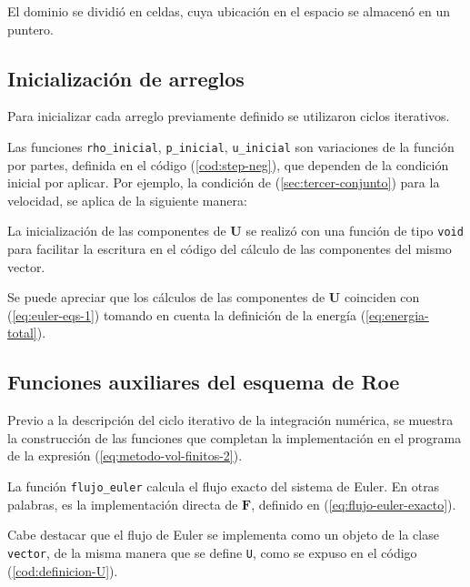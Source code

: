 El dominio se dividió en celdas, cuya ubicación en el espacio se almacenó en un puntero.

\subsection{Inicialización de arreglos}
Para inicializar cada arreglo previamente definido se utilizaron ciclos iterativos.


Las funciones \texttt{rho\_inicial}, \texttt{p\_inicial}, \texttt{u\_inicial} son variaciones de la función por partes, definida en el código (\ref{cod:step-neg}), que dependen de la condición inicial por aplicar. Por ejemplo, la condición de (\ref{sec:tercer-conjunto}) para la velocidad, se aplica de la siguiente manera:


La inicialización de las componentes de $\mathbf{{U}}$ se realizó con una función de tipo \texttt{void} para facilitar la escritura en el código del cálculo de las componentes del mismo vector.

Se puede apreciar que los cálculos de las componentes de $\mathbf{{U}}$ coinciden con (\ref{eq:euler-eqs-1}) tomando en cuenta la definición de la energía (\ref{eq:energia-total}).
\subsection{Funciones auxiliares del esquema de Roe}
Previo a la descripción del ciclo iterativo de la integración numérica, se muestra la construcción de las funciones que completan la implementación en el programa de la expresión (\ref{eq:metodo-vol-finitos-2}).

La función \texttt{flujo\_euler} calcula el flujo exacto del sistema de Euler. En otras palabras, es la implementación directa de $\mathbf{{F}}$, definido en (\ref{eq:flujo-euler-exacto}).

Cabe destacar que el flujo de Euler se implementa como un objeto de la clase \texttt{vector}, de la misma manera que se define \texttt{U}, como se expuso en el código (\ref{cod:definicion-U}).

